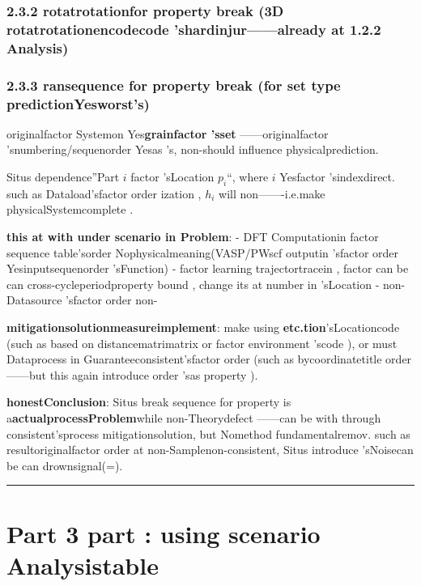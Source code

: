 \documentclass[
  12pt,
]{article}
\begin{document}
\subsubsection{2.3.2 rotatrotationfor property break (3D rotatrotationencodecode 'shardinjur------already at  1.2.2
Analysis)}\label{ux65cbux8f6cux5bf9ux79f0ux6027ux7834ux574f3d-ux65cbux8f6cux7f16ux7801ux7684ux786cux4f24ux5df2ux5728-1.2.2-ux5206ux6790}

\subsubsection{2.3.3
ransequence for property break (for set type predictionYesworst's)}\label{ux6392ux5217ux5bf9ux79f0ux6027ux7834ux574fux5bf9ux96c6ux5408ux578bux9884ux6d4bux662fux574fux7684}

originalfactor Systemon Yes\textbf{grainfactor 'sset }------originalfactor 'snumbering/sequenorder Yesas 's, non-should influence physicalprediction. 

Situs dependence''Part \(i\) factor 'sLocation \(p_i\)``, where \(i\)
Yesfactor 'sindexdirect. such as Dataload'sfactor order ization , \(h_i\)
will non-------i.e.make physicalSystemcomplete . 

\textbf{this at with under scenario in Problem}:  - DFT
Computationin factor sequence table'sorder Nophysicalmeaning(VASP/PWscf
outputin 'sfactor order Yesinputsequenorder 'sFunction) -
factor learning trajectortracein , factor can be can cross-cycleperiodproperty bound , change its at number in 'sLocation -
non-Datasource 'sfactor order non-

\textbf{mitigationsolutionmeasureimplement}: make using \textbf{etc.tion}'sLocationcode (such as based on distancematrimatrix or factor environment 'scode ), or must Dataprocess in Guaranteeconsistent'sfactor order (such as bycoordinatetitle order ------but this again introduce order 'sas property ). 

\textbf{honestConclusion}: Situs
break sequence for property is a\textbf{actualprocessProblem}while non-Theorydefect ------can be with through consistent'sprocess mitigationsolution, but Nomethod fundamentalremov. such as resultoriginalfactor order at non-Samplenon-consistent, Situs
introduce 'sNoisecan be can drownsignal(=). 

\begin{center}\rule{0.5\linewidth}{0.5pt}\end{center}

\section{Part 3
part : using scenario Analysistable}\label{ux7b2c-3-ux90e8ux5206ux9002ux7528ux573aux666fux5206ux6790ux8868}
\end{document}
